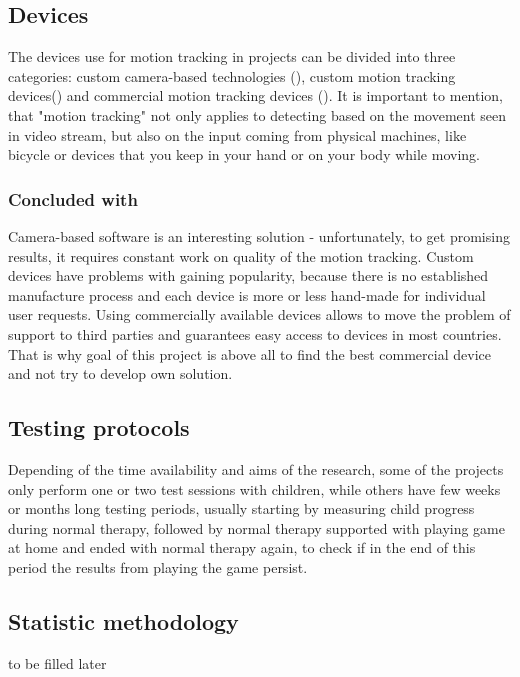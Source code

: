 \subsection{Devices}
The devices use for motion tracking in projects can be divided into three categories: custom camera-based technologies (\cite{vr_cp}), custom motion tracking devices(\cite{vr_cp,bimanual,action}) and commercial motion tracking devices (\cite{game_custom,inverse,game_xbox_360,balance}). It is important to mention, that "motion tracking" not only applies to detecting based on the movement seen in video stream, but also on the input coming from physical machines, like bicycle or devices that you keep in your hand or on your body while moving. 
\subsubsection{Concluded with}
Camera-based software is an interesting solution - unfortunately, to get promising results, it requires constant work on quality of the motion tracking. Custom devices have problems with gaining popularity, because there is no established manufacture process and each device is more or less hand-made for individual user requests. Using commercially available devices allows to move the problem of support to third parties and guarantees easy access to devices in most countries. That is why goal of this project is above all to find the best commercial device and not try to develop own solution. 
\subsection{Testing protocols}
Depending of the time availability and aims of the research, some of the projects only perform one or two test sessions with children, while others have few weeks or months long testing periods, usually starting by measuring child progress during normal therapy, followed by normal therapy supported with playing game at home and ended with normal therapy again, to check if in the end of this period the results from playing the game persist.  
\subsection{Statistic methodology}
to be filled later